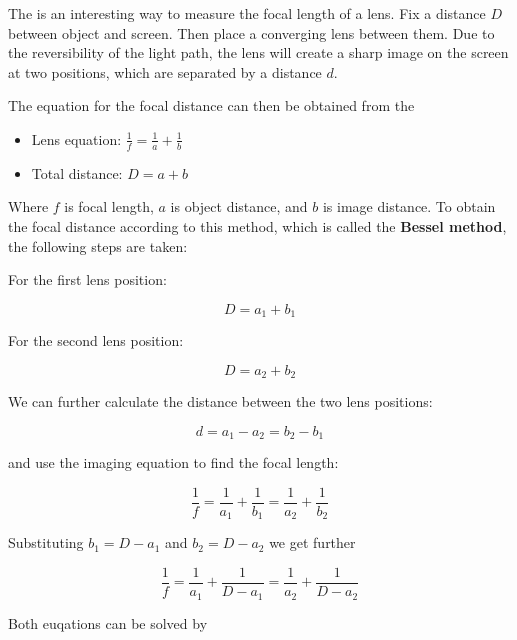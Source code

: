 \documentclass[
  a4paper,
]{book}
\providecommand{\tightlist}{%
  \setlength{\itemsep}{0pt}\setlength{\parskip}{0pt}}
\begin{document}
\begin{tcolorbox}[enhanced jigsaw, coltitle=black, title=\textcolor{quarto-callout-note-color}{\faInfo}\hspace{0.5em}{Bessel's method to measure the focal length of a lens}, colframe=quarto-callout-note-color-frame, toprule=.15mm, opacitybacktitle=0.6, left=2mm, opacityback=0, breakable, toptitle=1mm, bottomtitle=1mm, leftrule=.75mm, arc=.35mm, titlerule=0mm, colbacktitle=quarto-callout-note-color!10!white, rightrule=.15mm, bottomrule=.15mm, colback=white]

The is an interesting way to measure the focal length of a lens. Fix a
distance \(D\) between object and screen. Then place a converging lens
between them. Due to the reversibility of the light path, the lens will
create a sharp image on the screen at two positions, which are separated
by a distance \(d\).

The equation for the focal distance can then be obtained from the

\begin{itemize}
\tightlist
\item
  Lens equation: \(\frac{1}{f} = \frac{1}{a} + \frac{1}{b}\)
\item
  Total distance: \(D = a + b\)
\end{itemize}

Where \(f\) is focal length, \(a\) is object distance, and \(b\) is
image distance. To obtain the focal distance according to this method,
which is called the \textbf{Bessel method}, the following steps are
taken:

For the first lens position:

\[D = a_1 + b_1\]

For the second lens position:

\[D = a_2 + b_2\]

We can further calculate the distance between the two lens positions:

\[d = a_1 - a_2 = b_2 - b_1\]

and use the imaging equation to find the focal length:

\[\frac{1}{f} = \frac{1}{a_1} + \frac{1}{b_1} = \frac{1}{a_2} + \frac{1}{b_2}\]

Substituting \(b_1 = D - a_1\) and \(b_2 = D - a_2\) we get further

\[\frac{1}{f} = \frac{1}{a_1} + \frac{1}{D-a_1} = \frac{1}{a_2} + \frac{1}{D-a_2}\]

Both euqations can be solved by


\end{tcolorbox}
\end{document}
